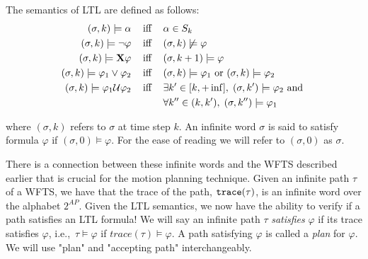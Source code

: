 \theoremstyle{definition}
\begin{definition}
\label{defLTLS}
The semantics of LTL are defined as follows:
\begin{align*}
(\sigma,k) \models \alpha \hspace{0.3cm}\text{ iff }\hspace{0.3cm}& \alpha \in S_k \\
(\sigma,k) \models \neg \varphi \hspace{0.3cm}\text{ iff }\hspace{0.3cm}& (\sigma, k) \not \models \varphi \\
(\sigma,k) \models \textbf{X} \varphi \hspace{0.3cm}\text{ iff }\hspace{0.3cm}& (\sigma, k+1) \models \varphi \\
(\sigma,k) \models \varphi_1 \lor \varphi_2 \hspace{0.3cm}\text{ iff }\hspace{0.3cm}& (\sigma,k) \models \varphi_1 \text{ or } (\sigma,k) \models \varphi_2 \\
(\sigma,k) \models \varphi_1 \mathcal{U} \varphi_2 \hspace{0.3cm}\text{ iff }\hspace{0.3cm}& \exists k' \in [k,+\inf ], \hspace{0.1cm} (\sigma ,k') \models \varphi_2 \text{ and } \\ &\forall k'' \in (k,k'), \hspace{0.1cm} (\sigma, k'') \models \varphi_1 
\end{align*}
\end{definition}
where $(\sigma,k)$ refers to $\sigma$ at time step $k$. An infinite word $\sigma$ is said to satisfy formula $\varphi$ if $(\sigma,0) \models \varphi$. For the ease of reading we will refer to $(\sigma,0)$ as $\sigma$. 

There is a connection between these infinite words and the WFTS described earlier that is crucial for the motion planning technique. Given an infinite path $\tau$ of a WFTS, we have that the trace of the path, $\texttt{trace}(\tau)$, is an infinite word over the alphabet $2^{AP}$. Given the LTL semantics, we now have the ability to verify if a path satisfies an LTL formula! We will say an infinite path $\tau$ \textit{satisfies} $\varphi$ if its trace satisfies $\varphi$, i.e.,\ $\tau \models \varphi$ if $trace(\tau) \models \varphi$. A path satisfying $\varphi$ is called a \textit{plan} for $\varphi$. We will use "plan" and "accepting path" interchangeably.




